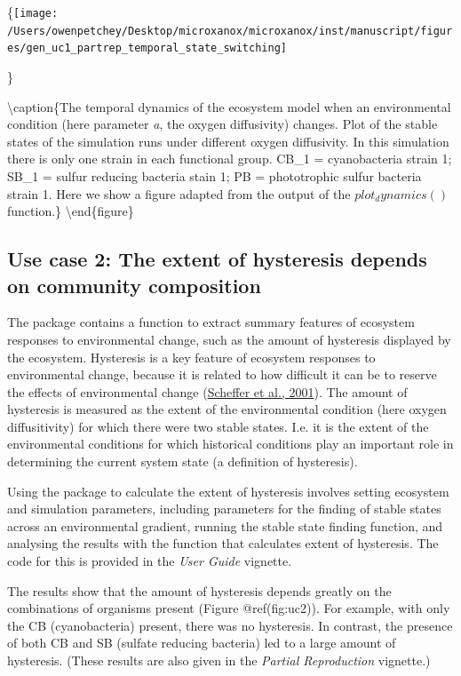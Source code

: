 \documentclass[]{elsarticle} %
\begin{document}
\{\centering \texttt{[image: /Users/owenpetchey/Desktop/microxanox/microxanox/inst/manuscript/figures/gen\_uc1\_partrep\_temporal\_state\_switching]}

\}

\textbackslash caption\{The temporal dynamics of the ecosystem model
when an environmental condition (here parameter \emph{a}, the oxygen
diffusivity) changes. Plot of the stable states of the simulation runs
under different oxygen diffusivity. In this simulation there is only one
strain in each functional group. CB\_1 = cyanobacteria strain 1; SB\_1 =
sulfur reducing bacteria stain 1; PB = phototrophic sulfur bacteria
strain 1. Here we show a figure adapted from the output of the
\(plot_dynamics()\) function.\}\label{fig:uc1}
\textbackslash end\{figure\}

\hypertarget{use-case-2-the-extent-of-hysteresis-depends-on-community-composition}{%
\subsection{Use case 2: The extent of hysteresis depends on community
composition}\label{use-case-2-the-extent-of-hysteresis-depends-on-community-composition}}

The package contains a function to extract summary features of ecosystem
responses to environmental change, such as the amount of hysteresis
displayed by the ecosystem. Hysteresis is a key feature of ecosystem
responses to environmental change, because it is related to how
difficult it can be to reserve the effects of environmental change
(\protect\hyperlink{ref-Scheffer2001}{Scheffer et al., 2001}). The
amount of hysteresis is measured as the extent of the environmental
condition (here oxygen diffusitivity) for which there were two stable
states. I.e. it is the extent of the environmental conditions for which
historical conditions play an important role in determining the current
system state (a definition of hysteresis).

Using the package to calculate the extent of hysteresis involves setting
ecosystem and simulation parameters, including parameters for the
finding of stable states across an environmental gradient, running the
stable state finding function, and analysing the results with the
function that calculates extent of hysteresis. The code for this is
provided in the \emph{User Guide} vignette.

The results show that the amount of hysteresis depends greatly on the
combinations of organisms present (Figure @ref(fig:uc2)). For example,
with only the CB (cyanobacteria) present, there was no hysteresis. In
contrast, the presence of both CB and SB (sulfate reducing bacteria) led
to a large amount of hysteresis. (These results are also given in the
\emph{Partial Reproduction} vignette.)
\end{document}

